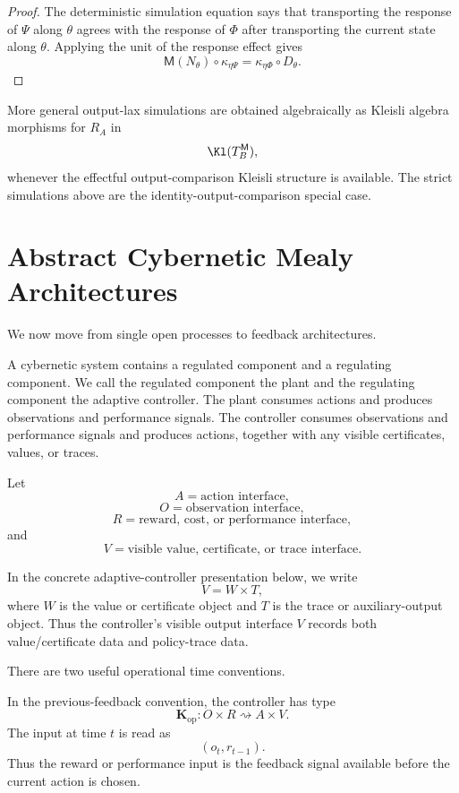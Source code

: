 \begin{proof}
The deterministic simulation equation says that transporting the response of \(\Psi\) along
\(\theta\) agrees with the response of \(\Phi\) after transporting the current state along
\(\theta\).  Applying the unit of the response effect gives
\[
\mathsf M(N_\theta)\circ \kappa_{\eta\Psi}
=
\kappa_{\eta\Phi}\circ D_\theta .
\]
\end{proof}

More general output-lax simulations are obtained algebraically as Kleisli algebra morphisms for
\(R_A\) in
\[
\Kl(T_B^{\mathsf M}),
\]
whenever the effectful output-comparison Kleisli structure is available.  The strict simulations
above are the identity-output-comparison special case.

\section{Abstract Cybernetic Mealy Architectures}
\label{sec:abstract-cybernetic-mealy-architectures}

We now move from single open processes to feedback architectures.

A cybernetic system contains a regulated component and a regulating component.  We call the
regulated component the plant and the regulating component the adaptive controller.  The plant
consumes actions and produces observations and performance signals.  The controller consumes
observations and performance signals and produces actions, together with any visible certificates,
values, or traces.

Let
\[
A=\text{action interface},
\]
\[
O=\text{observation interface},
\]
\[
R=\text{reward, cost, or performance interface},
\]
and
\[
V=\text{visible value, certificate, or trace interface}.
\]

In the concrete adaptive-controller presentation below, we write
\[
V=W\times T,
\]
where \(W\) is the value or certificate object and \(T\) is the trace or auxiliary-output object.
Thus the controller's visible output interface \(V\) records both value/certificate data and
policy-trace data.

There are two useful operational time conventions.

In the previous-feedback convention, the controller has type
\[
\mathbf K_{\mathrm{op}}:O\times R\rightsquigarrow A\times V.
\]
The input at time \(t\) is read as
\[
(o_t,r_{t-1}).
\]
Thus the reward or performance input is the feedback signal available before the current action is
chosen.


